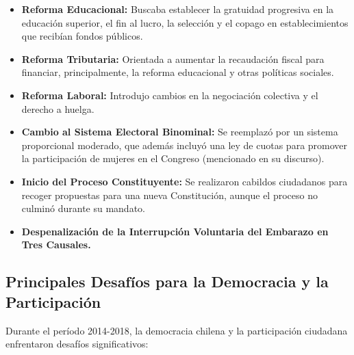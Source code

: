 \documentclass[11pt]{article}
\begin{document}
\begin{itemize}
    \item \textbf{Reforma Educacional:} Buscaba establecer la gratuidad progresiva en la educación superior, el fin al lucro, la selección y el copago en establecimientos que recibían fondos públicos.
    \item \textbf{Reforma Tributaria:} Orientada a aumentar la recaudación fiscal para financiar, principalmente, la reforma educacional y otras políticas sociales.
    \item \textbf{Reforma Laboral:} Introdujo cambios en la negociación colectiva y el derecho a huelga.
    \item \textbf{Cambio al Sistema Electoral Binominal:} Se reemplazó por un sistema proporcional moderado, que además incluyó una ley de cuotas para promover la participación de mujeres en el Congreso (mencionado en su discurso).
    \item \textbf{Inicio del Proceso Constituyente:} Se realizaron cabildos ciudadanos para recoger propuestas para una nueva Constitución, aunque el proceso no culminó durante su mandato.
    \item \textbf{Despenalización de la Interrupción Voluntaria del Embarazo en Tres Causales.}
\end{itemize}

\subsection*{Principales Desafíos para la Democracia y la Participación}

Durante el período 2014-2018, la democracia chilena y la participación ciudadana enfrentaron desafíos significativos:
\end{document}
